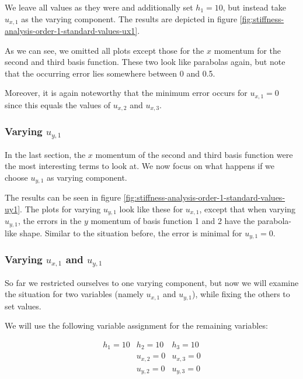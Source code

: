 \documentclass[a4paper, twoside]{article}
\begin{document}
We leave all values as they were and additionally set $h_1=10$, but instead take $u_{x,1}$ as the varying component. The results are depicted in figure \ref{fig:stiffness-analysis-order-1-standard-values-ux1}.



As we can see, we omitted all plots except those for the $x$ momentum for the second and third basis function. These two look like parabolas again, but note that the occurring error lies somewhere between 0 and 0.5.

Moreover, it is again noteworthy that the minimum error occurs for $u_{x,1}=0$ since this equals the values of $u_{x,2}$ and $u_{x,3}$.

\subsubsection{\texorpdfstring{Varying $u_{y,1}$}{Varying uy1}}

In the last section, the $x$ momentum of the second and third basis function were the most interesting terms to look at. We now focus on what happens if we choose $u_{y,1}$ as varying component.



The results can be seen in figure \ref{fig:stiffness-analysis-order-1-standard-values-uy1}. The plots for varying $u_{y,1}$ look like these for $u_{x,1}$, except that when varying $u_{y,1}$, the errors in the $y$ momentum of basis function 1 and 2 have the parabola-like shape. Similar to the situation before, the error is minimal for $u_{y,1}=0$.

\subsubsection{\texorpdfstring{Varying $u_{x,1}$ and $u_{y,1}$}{Varying ux1 and uy1}}

So far we restricted ourselves to one varying component, but now we will examine the situation for two variables (namely $u_{x,1}$ and $u_{y,1}$), while fixing the others to set values.

We will use the following variable assignment for the remaining variables:

\begin{eqnarray*}
  h_1 = 10 & h_2 = 10 & h_3 = 10 \\
   & u_{x,2} = 0 & u_{x,3} = 0 \\
   & u_{y,2} = 0 & u_{y,3} = 0
\end{eqnarray*}
\end{document}
